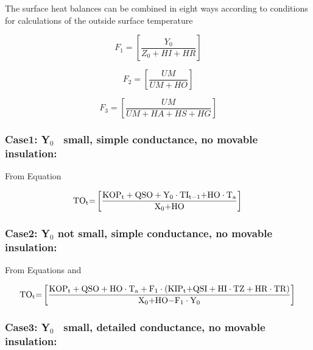 The surface heat balances can be combined in eight ways according to conditions for calculations of the outside surface temperature

\begin{equation}
{F_1} = \left[ {\frac{{{Y_0}}}{{{Z_0} + HI + HR}}} \right]
\end{equation}

\begin{equation}
{F_2} = \left[ {\frac{{UM}}{{UM + HO}}} \right]
\end{equation}

\begin{equation}
{F_3} = \left[ {\frac{{UM}}{{UM + HA + HS + HG}}} \right]
\end{equation}

\subsubsection{Case1: Y\(_{0}\)~ small, simple conductance, no movable insulation:}\label{case1-yux5f0-small-simple-conductance-no-movable-insulation}

From Equation

\begin{equation}
{\rm{T}}{{\rm{O}}_{\rm{t}}}{\rm{ = }}\left[ {\frac{{{\rm{KO}}{{\rm{P}}_{\rm{t}}} + {\rm{QSO}} + {{\rm{Y}}_0}\cdot {\rm{T}}{{\rm{I}}_{{\rm{t - 1}}}}{\rm{ + HO}}\cdot {{\rm{T}}_{\rm{a}}}}}{{{{\rm{X}}_{\rm{0}}}{\rm{ + HO}}}}} \right]{\rm{  }}
\end{equation}

\subsubsection{Case2: Y\(_{0}\) not small, simple conductance, no movable insulation:}\label{case2-yux5f0-not-small-simple-conductance-no-movable-insulation}

From Equations and

\begin{equation}
{\rm{T}}{{\rm{O}}_{\rm{t}}}{\rm{ = }}\left[ {\frac{{{\rm{KO}}{{\rm{P}}_{\rm{t}}} + {\rm{QSO}} + {\rm{HO}}\cdot {{\rm{T}}_{\rm{a}}} + {{\rm{F}}_1}\cdot \left( {{\rm{KI}}{{\rm{P}}_{\rm{t}}}{\rm{ + QSI + HI}}\cdot {\rm{TZ + HR}}\cdot {\rm{TR}}} \right)}}{{{{\rm{X}}_{\rm{0}}}{\rm{ + HO - }}{{\rm{F}}_{\rm{1}}}\cdot {{\rm{Y}}_0}}}} \right]{\rm{  }}
\end{equation}

\subsubsection{Case3: Y\(_{0}\)~ small, detailed conductance, no movable insulation:}\label{case3-yux5f0-small-detailed-conductance-no-movable-insulation}

